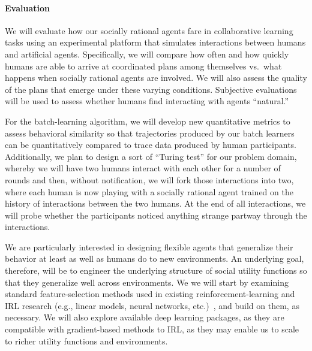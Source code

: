 
\vspace{\up}
\paragraph{Evaluation}

We will evaluate how our socially rational agents fare in
collaborative learning tasks using an experimental platform that
simulates interactions between humans and artificial agents.
Specifically, we will compare how often and how quickly humans are
able to arrive at coordinated plans among themselves vs.\ what happens
when socially rational agents are involved.  We will also assess the
quality of the plans that emerge under these varying conditions.
Subjective evaluations will be used to assess whether humans
find interacting with agents ``natural.''

For the batch-learning algorithm, we will develop new quantitative
metrics to assess behavioral similarity so that trajectories produced
by our batch learners can be quantitatively compared to trace data
produced by human participants.  Additionally, we plan to design a
sort of ``Turing test'' for our problem domain, whereby we will have
two humans interact with each other for a number of rounds and then,
without notification, we will fork those interactions into two, where
each human is now playing with a socially rational agent trained
on the history of interactions between the two humans.  At the end of
all interactions, we will probe whether the participants noticed anything
strange partway through the interactions.

We are particularly interested in designing flexible agents that
generalize their behavior at least as well as humans do to new
environments.
%
An underlying goal, therefore, will be to engineer the underlying
structure of social utility functions so that they generalize well
across environments.  We we will start by examining standard
feature-selection methods used in existing reinforcement-learning and
IRL research (e.g., linear models, neural networks,
etc.)~\cite{diuk2009adaptive,kolter2009regularization,li2009reinforcement,parr2008analysis},
and build on them, as necessary.  We will also explore available deep
learning packages, as they are compatible with gradient-based methods
to IRL, as they may enable us to scale to richer utility functions and
environments.

